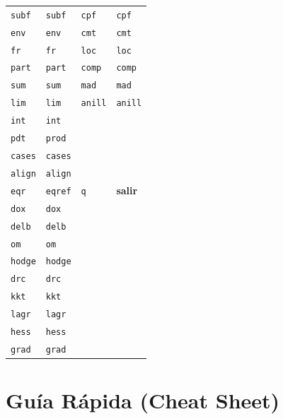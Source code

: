 \documentclass[11pt]{article}
\begin{document}
\begin{center}
\begin{tabular}{llll}
\texttt{subf} & \texttt{subf} & \texttt{cpf} & \texttt{cpf}\\
\texttt{env} & \texttt{env} & \texttt{cmt} & \texttt{cmt}\\
\texttt{fr} & \texttt{fr} & \texttt{loc} & \texttt{loc}\\
\texttt{part} & \texttt{part} & \texttt{comp} & \texttt{comp}\\
\texttt{sum} & \texttt{sum} & \texttt{mad} & \texttt{mad}\\
\texttt{lim} & \texttt{lim} & \texttt{anill} & \texttt{anill}\\
\texttt{int} & \texttt{int} &  & \\
\texttt{pdt} & \texttt{prod} &  & \\
\texttt{cases} & \texttt{cases} &  & \\
\texttt{align} & \texttt{align} &  & \\
\texttt{eqr} & \texttt{eqref} & \texttt{q} & \textbf{salir}\\
\texttt{dox} & \texttt{dox} &  & \\
\texttt{delb} & \texttt{delb} &  & \\
\texttt{om} & \texttt{om} &  & \\
\texttt{hodge} & \texttt{hodge} &  & \\
\texttt{drc} & \texttt{drc} &  & \\
\texttt{kkt} & \texttt{kkt} &  & \\
\texttt{lagr} & \texttt{lagr} &  & \\
\texttt{hess} & \texttt{hess} &  & \\
\texttt{grad} & \texttt{grad} &  & \\
\end{tabular}
\end{center}
\section{Guía Rápida (Cheat Sheet)}
\label{sec:org6df1dd5}
\end{document}
